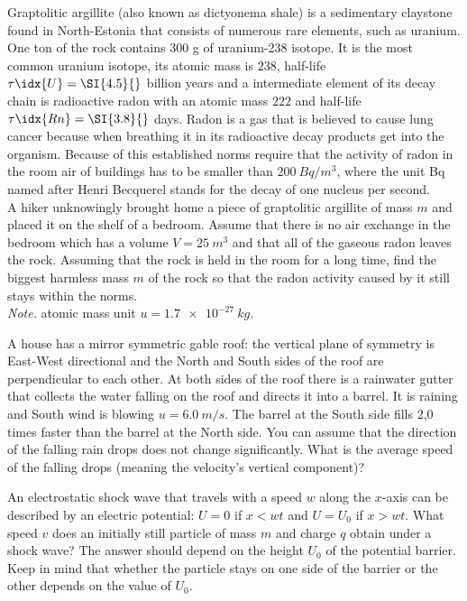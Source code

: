 \documentclass[11pt]{article}
\begin{document}
\probeng
Graptolitic argillite (also known as dictyonema shale) is a sedimentary claystone found in North-Estonia that consists of numerous rare elements, such as uranium. One ton of the rock contains 300 g of uranium-238 isotope. It is the most common uranium isotope, its atomic mass is $238$, half-life $\tau\idx{U}=\SI{4.5}{}$ billion years and a intermediate element of its decay chain is radioactive radon with an atomic mass $222$ and half-life $\tau\idx{Rn}=\SI{3.8}{}$ days. Radon is a gas that is believed to cause lung cancer because when breathing it in its radioactive decay products get into the organism. Because of this established norms require that the activity of radon in the room air of buildings has to be smaller than $\SI{200}{Bq/m^3}$, where the unit Bq named after Henri Becquerel stands for the decay of one nucleus per second.\\
A hiker unknowingly brought home a piece of graptolitic argillite of mass $m$ and placed it on the shelf of a bedroom. Assume that there is no air exchange in the bedroom which has a volume $V=\SI{25}{m^3}$ and that all of the gaseous radon leaves the rock. Assuming that the rock is held in the room for a long time, find the biggest harmless mass $m$ of the rock so that the radon activity caused by it still stays within the norms.\\
\emph{Note.} atomic mass unit $u=\SI{1.7e-27}{kg}$.
\probend
\bigskip


\probeng
A house has a mirror symmetric gable roof: the vertical plane of symmetry is East-West directional and the North and South sides of the roof are perpendicular to each other. At both sides of the roof there is a rainwater gutter that collects the water falling on the roof and directs it into a barrel. It is raining and South wind is blowing $u= \SI{6,0}{m/s}$. The barrel at the South side fills 2,0 times faster than the barrel at the North side. You can assume that the direction of the falling rain drops does not change significantly. What is the average speed of the falling drops (meaning the velocity’s vertical component)?
\probend
\bigskip


\probeng
An electrostatic shock wave that travels with a speed $w$ along the $x$-axis can be described by an electric potential: $U=0$ if $x<wt$ and $U=U_0$ if $x>wt$. What speed $v$ does an initially still particle of mass $m$ and charge $q$ obtain under a shock wave? The answer should depend on the height $U_0$ of the potential barrier. Keep in mind that whether the particle stays on one side of the barrier or the other depends on the value of $U_0$.
\probend
\bigskip
\end{document}
